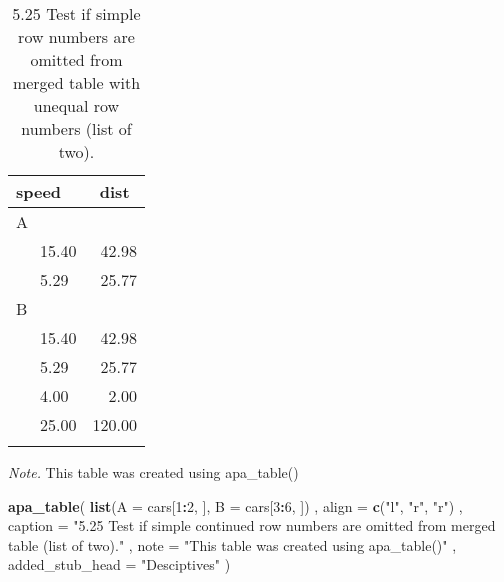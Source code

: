 \documentclass[man]{apa6}
\newenvironment{Shaded}{\begin{snugshade}}{\end{snugshade}}
\newcommand{\KeywordTok}[1]{\textcolor[rgb]{0.13,0.29,0.53}{\textbf{#1}}}
\newcommand{\DataTypeTok}[1]{\textcolor[rgb]{0.13,0.29,0.53}{#1}}
\newcommand{\DecValTok}[1]{\textcolor[rgb]{0.00,0.00,0.81}{#1}}
\newcommand{\StringTok}[1]{\textcolor[rgb]{0.31,0.60,0.02}{#1}}
\newcommand{\OperatorTok}[1]{\textcolor[rgb]{0.81,0.36,0.00}{\textbf{#1}}}
\newcommand{\NormalTok}[1]{#1}
\begin{document}
\begin{table}[tbp]
\begin{center}
\begin{threeparttable}
\caption{\label{tab:unnamed-chunk-5}5.25 Test if simple row numbers are omitted from merged table with unequal row numbers (list of two).}
\begin{tabular}{lr}
\toprule
speed & \multicolumn{1}{c}{dist}\\
\midrule
A & \\
\ \ \ 15.40 & 42.98\\
\ \ \ 5.29 & 25.77\\
B & \\
\ \ \ 15.40 & 42.98\\
\ \ \ 5.29 & 25.77\\
\ \ \ 4.00 & 2.00\\
\ \ \ 25.00 & 120.00\\
\bottomrule
\addlinespace
\end{tabular}
\begin{tablenotes}[para]
\normalsize{\textit{Note.} This table was created using apa\_table()}
\end{tablenotes}
\end{threeparttable}
\end{center}
\end{table}

\begin{Shaded}
\begin{Highlighting}[]
\KeywordTok{apa_table}\NormalTok{(}
  \KeywordTok{list}\NormalTok{(}\DataTypeTok{A =}\NormalTok{ cars[}\DecValTok{1}\OperatorTok{:}\DecValTok{2}\NormalTok{, ], }\DataTypeTok{B =}\NormalTok{ cars[}\DecValTok{3}\OperatorTok{:}\DecValTok{6}\NormalTok{, ])}
\NormalTok{  , }\DataTypeTok{align =} \KeywordTok{c}\NormalTok{(}\StringTok{"l"}\NormalTok{, }\StringTok{"r"}\NormalTok{, }\StringTok{"r"}\NormalTok{)}
\NormalTok{  , }\DataTypeTok{caption =} \StringTok{"5.25 Test if simple continued row numbers are omitted from merged table (list of two)."}
\NormalTok{  , }\DataTypeTok{note =} \StringTok{"This table was created using apa_table()"}
\NormalTok{  , }\DataTypeTok{added_stub_head =} \StringTok{"Desciptives"}
\NormalTok{)}
\end{Highlighting}
\end{Shaded}
\end{document}
